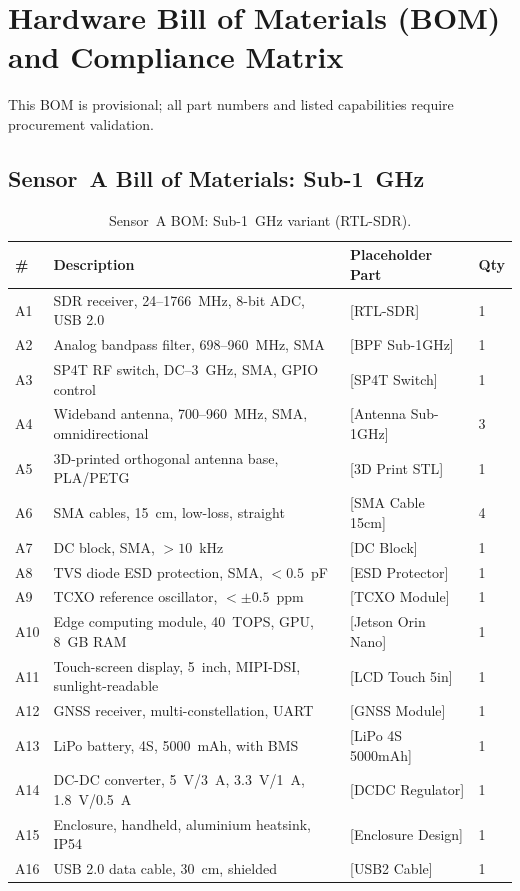 \documentclass[11pt,a4paper]{article}
\begin{document}
\section{Hardware Bill of Materials (BOM) and Compliance Matrix}
\label{sec:bom_matrix}

This BOM is provisional; all part numbers and listed capabilities require procurement validation.

\subsection{Sensor~A Bill of Materials: Sub-1~GHz}

\begin{table}[ht]
\centering
\caption{Sensor~A BOM: Sub-1~GHz variant (RTL-SDR).}
\label{tab:bom_sensorA}
\small
\begin{tabular}{L{1.0cm} L{5.0cm} L{4.0cm} C{2.0cm}}
\toprule
\textbf{\#} & \textbf{Description} & \textbf{Placeholder Part} & \textbf{Qty} \\
\midrule
A1 & SDR receiver, 24--1766~MHz, 8-bit ADC, USB 2.0 & [RTL-SDR] & 1 \\
A2 & Analog bandpass filter, 698--960~MHz, SMA & [BPF Sub-1GHz] & 1 \\
A3 & SP4T RF switch, DC--3~GHz, SMA, GPIO control & [SP4T Switch] & 1 \\
A4 & Wideband antenna, 700--960~MHz, SMA, omnidirectional & [Antenna Sub-1GHz] & 3 \\
A5 & 3D-printed orthogonal antenna base, PLA/PETG & [3D Print STL] & 1 \\
A6 & SMA cables, 15~cm, low-loss, straight & [SMA Cable 15cm] & 4 \\
A7 & DC block, SMA, $> 10$~kHz & [DC Block] & 1 \\
A8 & TVS diode ESD protection, SMA, $< 0.5$~pF & [ESD Protector] & 1 \\
A9 & TCXO reference oscillator, $< \pm 0.5$~ppm & [TCXO Module] & 1 \\
A10 & Edge computing module, 40~TOPS, GPU, 8~GB RAM & [Jetson Orin Nano] & 1 \\
A11 & Touch-screen display, 5~inch, MIPI-DSI, sunlight-readable & [LCD Touch 5in] & 1 \\
A12 & GNSS receiver, multi-constellation, UART & [GNSS Module] & 1 \\
A13 & LiPo battery, 4S, 5000~mAh, with BMS & [LiPo 4S 5000mAh] & 1 \\
A14 & DC-DC converter, 5~V/3~A, 3.3~V/1~A, 1.8~V/0.5~A & [DCDC Regulator] & 1 \\
A15 & Enclosure, handheld, aluminium heatsink, IP54 & [Enclosure Design] & 1 \\
A16 & USB 2.0 data cable, 30~cm, shielded & [USB2 Cable] & 1 \\
\bottomrule
\end{tabular}
\end{table}
\end{document}

